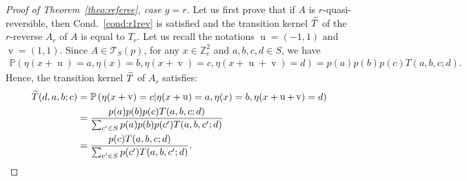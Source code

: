 \documentclass[10pt]{amsart}
\theoremstyle{definition}\newtheorem{defi}[theo]{Definition}\newtheorem{rema}[theo]{Remark}\newtheorem{exam}[theo]{Example}\newtheorem{exem}[theo]{Example}\newtheorem{nota}[theo]{Notation}
\let\oldtilde\tilde
\renewcommand*{\tilde}[1]{\mathchoice{\widetilde{#1}}{\widetilde{#1}}{\oldtilde{#1}}{\oldtilde{#1}}}
\newcounter{a}
\newcommand{\Cond}{Cond.}
\newcommand{\triang}[2]{\mathcal{T}_{#1} \left(#2 \right)}
\newcommand{\Z}{\mathbb{Z}}
\newcommand{\Pbb}{\mathbb{P}}
\DeclareMathOperator{\vu}{u}
\DeclareMathOperator{\vv}{v}
\begin{document}
\goodbreak
\begin{proof}[Proof of Theorem~\ref{theo:referee}, case $g=r$]
Let us first prove that if $A$ is $r$-quasi-reversible, then \Cond~\ref{cond:r1rev} is satisfied and the transition kernel $\tilde T$ of the $r$-reverse $A_r$ of $A$ is equal to $T_r$. Let us recall the notations $\vu=(-1,1)$ and $\vv=(1,1)$. Since $A \in \triang{S}{p}$, for any $x \in \Z_{e}^2$ and $a,b,c,d \in S$, we have
\begin{align*}
\Pbb\left(\eta(x+\vu) = a, \eta(x) = b, \eta(x + \vv) = c, \eta(x+\vu+\vv) = d\right) = p(a) p(b) p(c) T(a,b,c;d).
\end{align*}
Hence, the transition kernel $\tilde T$ of $A_r$ satisfies:
\begin{equation}
\begin{aligned}
\tilde T(d,a,b;c)& = \Pbb\left(\eta(x + \vv) = c | \eta(x + \vu) = a, \eta(x) = b, \eta(x + \vu + \vv) = d\right) \\
& = \frac{p(a) p(b) p(c) T(a,b,c;d)}{\sum_{c'\in S} p(a) p(b) p(c') T(a,b,c';d)}  \\
& = \frac{p(c) T(a,b,c;d)}{\sum_{c'\in S} p(c') T(a,b,c';d)}. \label{eq:uniquerev}
\end{aligned}
\end{equation}


\end{proof}
\end{document}
